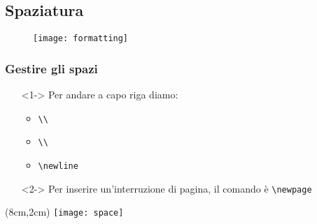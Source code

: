 \subsection{Spaziatura}
\begin{frame}
 \begin{figure}[h]
  \centering
  \texttt{[image: formatting]}
 \end{figure}

\end{frame}

\begin{frame}
 \frametitle{Gestire gli spazi}
 
 \begin{itemize}
  \item[]<1-> Per andare a capo riga diamo:
  \begin{itemize}
    \item \texttt{\textbackslash \textbackslash}
    \item \texttt{\textbackslash \textbackslash *}
    \item \texttt{\textbackslash newline}
  \end{itemize}
  
  \item[]<2-> Per inserire un'interruzione di pagina, il comando è 
\texttt{\textbackslash newpage}
 
 \end{itemize}
 
 \begin{textblock*}{5cm}(8cm,2cm)
   \texttt{[image: space]}
 \end{textblock*}
 
\end{frame}
